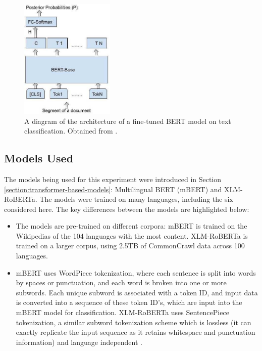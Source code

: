 \documentclass{l4proj}
\begin{document}
 \begin{figure}[h]
\centering
\includegraphics[width=0.4\textwidth]{images/bert finetuning.png}
\caption{A diagram of the architecture of a fine-tuned BERT model on text classification. Obtained from \cite{pappagari2019hierarchical}.}
\label{fig:bert-finetuning}
\end{figure}


\subsection{Models Used}
\par
The models being used for this experiment were introduced in Section \ref{section:transformer-based-models}: Multilingual BERT (mBERT) and XLM-RoBERTa. The models were trained on many languages, including the six considered here. The key differences between the models are highlighted below:
\begin{itemize}
    \item The models are pre-trained on different corpora: mBERT is trained on the Wikipedias of the 104 languages with the most content. XLM-RoBERTa is trained on a larger corpus, using 2.5TB of CommonCrawl data across 100 languages. 
    \item mBERT uses WordPiece tokenization, where each sentence is split into words by spaces or punctuation, and each word is broken into one or more subwords. Each unique subword is associated with a token ID, and input data is converted into a sequence of these token ID's, which are input into the mBERT model for classification. XLM-RoBERTa uses SentencePiece tokenization, a similar subword tokenization scheme which is lossless (it can exactly replicate the input sequence as it retains whitespace and punctuation information) and language independent \citep{kudo2018sentencepiece}. 
\end{itemize}
 
\end{document}
